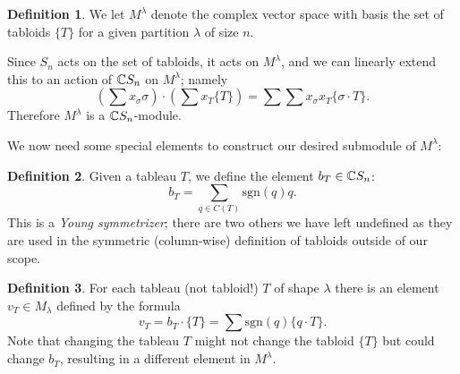 \documentclass[12pt,twoside]{reedthesis}
\theoremstyle{plain}   %
\theoremstyle{definition}
\newtheorem{defn}{Definition}[section]
\theoremstyle{remark}
\numberwithin{equation}{section}
\def\sgn{\mathrm{sgn}}
\begin{document}
  \begin{defn}
    We let $M^\lambda$ denote the complex vector space with basis the set of tabloids $\{T\}$ for a given partition $\lambda$ of size $n$.\par
    Since $S_n$ acts on the set of tabloids, it acts on $M^\lambda$, and we can linearly extend this to an action of $\mathbb{C} S_n$ on $M^\lambda$;
    namely
    \[ (\sum x_\sigma \sigma) \cdot (\sum x_T \{T\}) = \sum \sum x_\sigma x_T \{ \sigma \cdot T \}.\]
    Therefore $M^\lambda$ is a $\mathbb{C} S_n$-module. 
  \end{defn}
  We now need some special elements to construct our desired submodule of $M^\lambda$:
  \begin{defn}
    Given a tableau $T$, we define the element $ b_T \in \mathbb{C} S_n$:
    \[b_T = \sum_{q \in C(T)} \sgn(q)q.\]
    This is a \emph{Young symmetrizer}; there are two others we have left undefined as they are used in the symmetric (column-wise)
    definition of tabloids outside of our scope.
  \end{defn}

  \begin{defn}
    For each tableau (not tabloid!) $T$ of shape $\lambda$ there is an element $v_T \in M_\lambda$
    defined by the formula
    \[v_T = b_T \cdot \{T\} = \sum \sgn(q) \{q \cdot T\}.\]
    Note that changing the tableau $T$ might not change the tabloid $\{T\}$ but could change $b_T$, resulting in a different element in $M^\lambda$.
  \end{defn}
\end{document}
